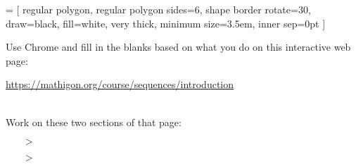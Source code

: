 \documentclass[12pt,letterpaper]{memoir}
\begin{document}
\pagestyle{plain}
\checkandfixthelayout
\raggedbottom


\noindent
\usetikzlibrary {shapes.geometric} 

    =
    [
        regular polygon, 
        regular polygon sides=6, 
        shape border rotate=30, 
        draw=black,
        fill=white,
        very thick,
        minimum size=3.5em,
        inner sep=0pt
    ]


\noindent 
Use Chrome and fill in the blanks based on
what you do on this interactive web page:

\hfill\url{https://mathigon.org/course/sequences/introduction}\hfill{}

\noindent \\Work on these two sections of that page:
\begin{itemize}[nosep]
    \item[$>$] 
    \item[$>$] 
\end{itemize}









\end{document}
